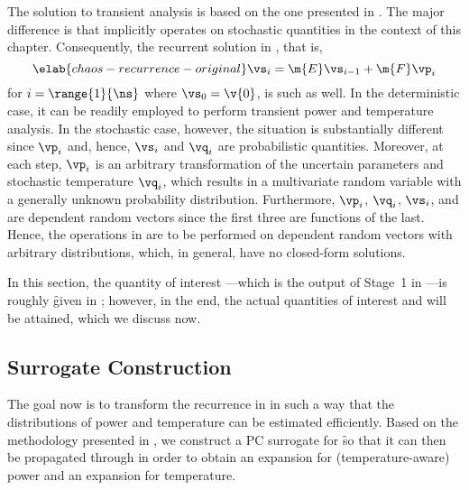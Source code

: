 The solution to transient analysis is based on the one presented in
. The major difference is that
 implicitly operates on stochastic quantities in the
context of this chapter. Consequently, the recurrent solution in
, that is,
\begin{equation} \elab{chaos-recurrence-original}
  \vs_i = \m{E} \vs_{i - 1} + \m{F} \vp_i
\end{equation}
for $i = \range{1}{\ns}$ where $\vs_0 = \v{0}$, is such as well. In the
deterministic case, it can be readily employed to perform transient power and
temperature analysis. In the stochastic case, however, the situation is
substantially different since $\vp_i$ and, hence, $\vs_i$ and $\vq_i$ are
probabilistic quantities. Moreover, at each step, $\vp_i$ is an arbitrary
transformation of the uncertain parameters \vu and stochastic temperature
$\vq_i$, which results in a multivariate random variable with a generally
unknown probability distribution. Furthermore, $\vp_i$, $\vq_i$, $\vs_i$, and
\vu are dependent random vectors since the first three are functions of the
last. Hence, the operations in  are to be
performed on dependent random vectors with arbitrary distributions, which, in
general, have no closed-form solutions.

In this section, the quantity of interest \g---which is the output of Stage~1 in
---is roughly \f given in ;
however, in the end, the actual quantities of interest \mp and \mq will be
attained, which we discuss now.

\subsection{Surrogate Construction}

The goal now is to transform the recurrence in 
in such a way that the distributions of power and temperature can be estimated
efficiently. Based on the methodology presented in
, we construct a \ac{PC} surrogate for \f so
that it can then be propagated through  in order
to obtain an expansion for (temperature-aware) power and an expansion for
temperature.

